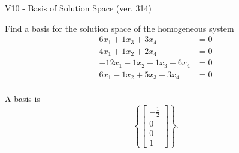 \begin{exercise}
  \begin{exerciseTitle}V10 - Basis of Solution Space (ver. 314)\end{exerciseTitle}
  \begin{exerciseStatement}
    Find a basis for the solution space of the homogeneous system 
\begin{align*}
 6 x_ 1 + 1 x_ 3 + 3 x_ 4 &= 0  \\ 
  4 x_ 1 + 1 x_ 2 + 2 x_ 4 &= 0  \\ 
  -12 x_ 1 -1 x_ 2 -1 x_ 3 -6 x_ 4 &= 0  \\ 
  6 x_ 1 -1 x_ 2 + 5 x_ 3 + 3 x_ 4 &= 0  \\ 
 \end{align*}


 
  \end{exerciseStatement}

  \begin{exerciseAnswer}
   A basis is   
\[\left\{\left[\begin{array}{c}
-\frac{1}{2} \\
0 \\
0 \\
1
\end{array}\right]\right\}.\]

  


  \end{exerciseAnswer}
\end{exercise}